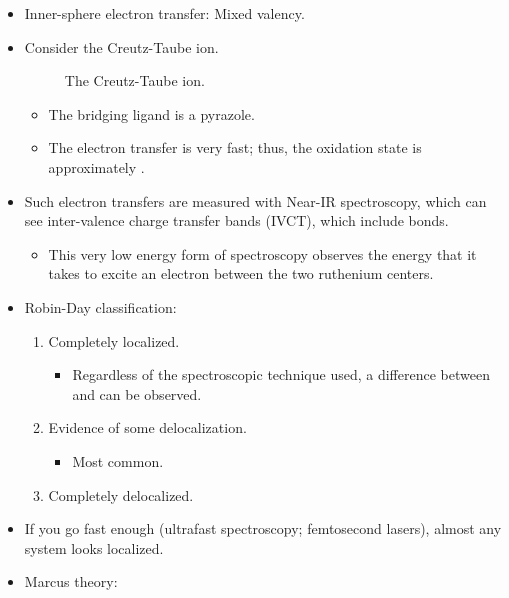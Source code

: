 \documentclass[../notes.tex]{subfiles}
\begin{document}
\begin{itemize}
\begin{itemize}
    \end{itemize}
    \item Inner-sphere electron transfer: Mixed valency.
    \item Consider the Creutz-Taube ion.
    \begin{figure}[H]
        \centering
        \chemleft{[}
        \chemright{]^{5+}}
        \caption{The Creutz-Taube ion.}
        \label{fig:CreutzTaube}
    \end{figure}
    \begin{itemize}
        \item The bridging ligand is a pyrazole.
        \item The electron transfer is very fast; thus, the oxidation state is approximately .
    \end{itemize}
    \item Such electron transfers are measured with Near-IR spectroscopy, which can see inter-valence charge transfer bands (IVCT), which include bonds.
    \begin{itemize}
        \item This very low energy form of spectroscopy observes the energy that it takes to excite an electron between the two ruthenium centers.
    \end{itemize}
    \item Robin-Day classification:
    \begin{enumerate}[label={\Roman*)}]
        \item Completely localized.
        \begin{itemize}
            \item Regardless of the spectroscopic technique used, a difference between  and  can be observed.
        \end{itemize}
        \item Evidence of some delocalization.
        \begin{itemize}
            \item Most common.
        \end{itemize}
        \item Completely delocalized.
    \end{enumerate}
    \item If you go fast enough (ultrafast spectroscopy; femtosecond lasers), almost any system looks localized.
    \item Marcus theory:
    \begin{itemize}

\end{itemize}
\end{itemize}
\end{document}
